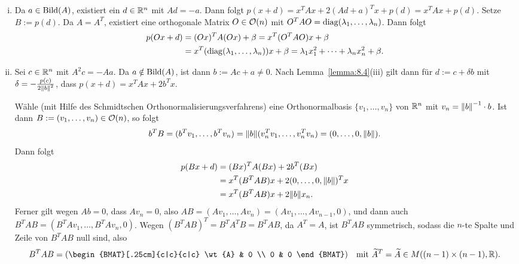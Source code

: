 \begin{beweis}
	\begin{enumerate}[(i)]
		\item Da $a \in \operatorname{Bild}(A)$, existiert ein $d \in \mathbb{R}^n$ mit $Ad = -a$.
		Dann folgt $p(x+d) = x^TAx + 2(Ad+a)^Tx + p(d) = x^T Ax + p(d)$.
		Setze $B := p(d)$.
		Da $A = A^T$, existiert eine orthogonale Matrix $O \in \mathcal{O}(n)$ mit $O^TAO = \operatorname{diag}(\lambda_1,\dots,\lambda_n)$.
		Dann folgt
		\begin{align*}
			p(Ox+d) &= (Ox)^TA(Ox) + \beta = x^T(O^TAO)x + \beta \\
			&= x^T(\operatorname{diag}(\lambda_1,\dots,\lambda_n))x + \beta = \lambda_1 x_1^2 + \dots + \lambda_n x_n^2 + \beta.
		\end{align*}
		\item Sei $c \in \mathbb{R}^n$ mit $A^2c = -Aa$.
		Da $a \notin \operatorname{Bild}(A)$, ist dann $b := Ac + a \neq 0$.
		Nach Lemma~\ref{lemma:8.4}(iii) gilt dann für $d := c + \delta b$ mit $\delta = - \frac{p(c)}{2 \left\lVert b\right\rVert^2}$, dass $p(x+d) = x^TAx + 2b^Tx$.

		Wähle (mit Hilfe des Schmidtschen Orthonormalisierungsverfahrens) eine Orthonormalbasis $\{v_1,\dots,v_n\}$ von $\mathbb{R}^n$ mit $v_n = \left\lVert b\right\rVert^{-1} \cdot b$.
		Ist dann $B := (v_1,\dots,v_n) \in \mathcal{O}(n)$, so folgt
		\[
			b^TB = (b^Tv_1,\dots,b^Tv_n) = \no{b} (v_n^Tv_1,\dots,v_n^Tv_n) = (0,\dots,0,\no{b}).
		\]
		Dann folgt
		\begin{align*}
			p(Bx+d) &= (Bx)^T A (Bx) + 2b^T(Bx) \\
			&= x^T(B^TAB)x + 2(0,\dots,0,\no{b})^Tx \\
			&= x^T(B^TAB)x + 2 \no{b} x_n.
		\end{align*}
		Ferner gilt wegen $Ab = 0$, dass $Av_n = 0$, also $AB = (Av_1,\dots,Av_n) = (Av_1,\dots,Av_{n-1},0)$, und dann auch $B^TAB = (B^TAv_1, \dots, B^TAv_n,0)$.
		Wegen $(B^TAB)^T = B^TA^TB = B^TAB$, da $A^T = A$, ist $B^TAB$ symmetrisch, sodass die $n$-te Spalte und Zeile von $B^TAB$ null sind, also
		\[
			B^TAB = \enb{\begin{BMAT}[.25cm]{c|c}{c|c}
				\wt{A} & 0 \\
				0 & 0
				\end{BMAT}} \quad \text{mit } \wt{A}^T = \wt{A} \in M((n-1) \times (n-1),\RR).
		\]
		  

\end{enumerate}
\end{beweis}
